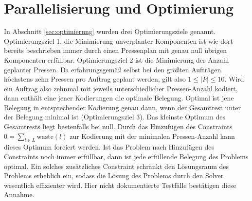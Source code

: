 \section{Parallelisierung und Optimierung}
\label{sec:parallelisierung}
In Abschnitt \ref{sec:optimierung} wurden drei Optimierungsziele genannt.
Optimierungsziel 1, die Minimierung unverplanter Komponenten ist wie dort bereits beschrieben immer durch einen Pressenplan mit genau null übrigen Komponenten erfüllbar.
Optimierungsziel 2 ist die Minimierung der Anzahl geplanter Pressen.
Da erfahrungsgemäß selbst bei den größten Aufträgen höchstens zehn Pressen pro Auftrag geplant werden, gilt also $1 \leq \lvert P \rvert \leq 10$.
Wird ein Auftrag also zehnmal mit jeweils unterschiedlicher Pressen-Anzahl kodiert, dann enthält eine jener Kodierungen die optimale Belegung.
Optimal ist jene Belegung in entsprechender Kodierung genau dann, wenn der Gesamtrest unter der Belegung minimal ist (Optimierungsziel 3).
Das kleinste Optimum des Gesamtrests liegt bestenfalls bei null.
Durch das Hinzufügen des Constraints $0 = \sum_{l \in L} \text{waste}(l)$ zur Kodierung mit der minimalen Pressen-Anzahl
kann dieses Optimum forciert werden.
Ist das Problem nach Hinzufügen des Constraints noch immer erfüllbar, dann ist jede erfüllende Belegung des Problems optimal.
Ein solches zusätzliches Constraint schränkt den Lösungsraum des Problems erheblich ein, sodass die Lösung des Problems durch den Solver wesentlich effizienter wird.
Hier nicht dokumentierte Testfälle bestätigen diese Annahme.

